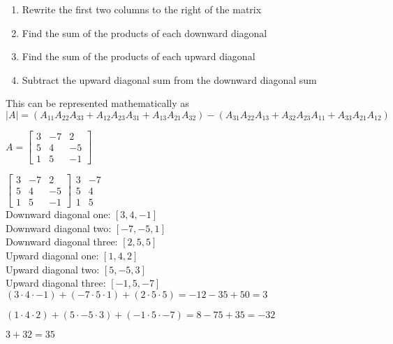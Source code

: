 \documentclass{report}
\begin{document}
\begin{enumerate}
    \item Rewrite the first two columns to the right of the matrix
    \item Find the sum of the products of each downward diagonal
    \item Find the sum of the products of each upward diagonal
    \item Subtract the upward diagonal sum from the downward diagonal sum
\end{enumerate}

This can be represented mathematically as $|A|=(A_{11}A_{22}A_{33}+A_{12}A_{23}A_{31}+A_{13}A_{21}A_{32})-(A_{31}A_{22}A_{13}+A_{32}A_{23}A_{11}+A_{33}A_{21}A_{12})$

 {
    $
        A=
        \begin{bmatrix}
            3 & -7 & 2 \\
            5 & 4 & -5 \\
            1 & 5 & -1
        \end{bmatrix}
    $

    $   
        \begin{bmatrix}
            3 & -7 & 2 \\
            5 & 4 & -5 \\
            1 & 5 & -1
        \end{bmatrix}
        \begin{matrix}
            3 & -7 \\
            5 & 4 \\
            1 & 5
        \end{matrix}
    $ \\

    Downward diagonal one: $[3,4,-1]$ \\
    Downward diagonal two: $[-7,-5,1]$ \\
    Downward diagonal three: $[2,5,5]$ \\
    
    Upward diagonal one: $[1,4,2]$ \\
    Upward diagonal two: $[5,-5,3]$ \\
    Upward diagonal three: $[-1,5,-7]$ \\

    $(3 \cdot 4 \cdot -1)+(-7 \cdot 5 \cdot 1)+(2 \cdot 5 \cdot 5)=-12-35+50=3$

    $(1 \cdot 4 \cdot 2)+(5 \cdot -5 \cdot 3)+(-1 \cdot 5 \cdot -7)=8-75+35=-32$

    $3+32=\boxed{35}$
}
\end{document}
